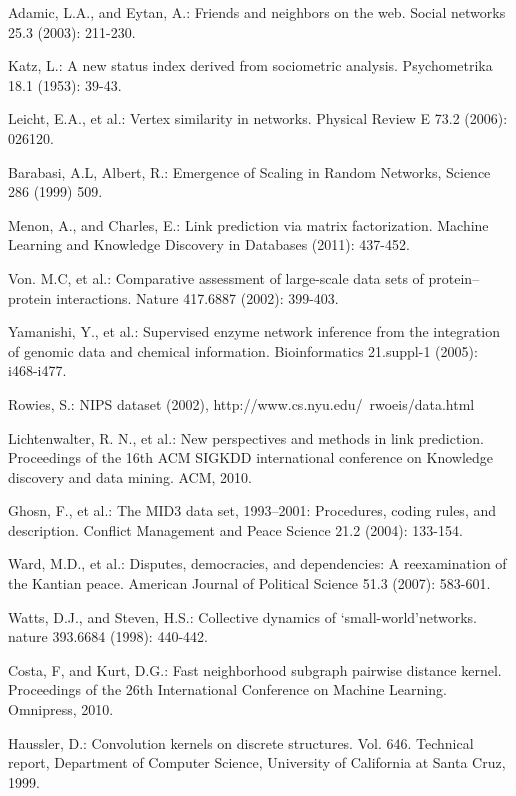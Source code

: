 \documentclass[runningheads,a4paper]{llncs}
\begin{document}
\begin{thebibliography}{4}

 Adamic, L.A., and Eytan, A.: Friends and neighbors on the web. Social networks 25.3 (2003): 211-230.

 Katz, L.: A new status index derived from sociometric analysis. Psychometrika 18.1 (1953): 39-43.

 Leicht, E.A., et al.: Vertex similarity in networks. Physical Review E 73.2 (2006): 026120.

  Barabasi, A.L, Albert, R.: Emergence of Scaling in Random Networks, Science 286 (1999) 509.

 Menon, A., and Charles, E.: Link prediction via matrix factorization. Machine Learning and Knowledge Discovery in Databases (2011): 437-452.

 Von. M.C, et al.: Comparative assessment of large-scale data sets of protein–protein interactions. Nature 417.6887 (2002): 399-403.

 Yamanishi, Y., et al.: Supervised enzyme network inference from the integration of genomic data and chemical information. Bioinformatics 21.suppl-1 (2005): i468-i477.

 Rowies, S.: NIPS dataset (2002), http://www.cs.nyu.edu/~rwoeis/data.html

 Lichtenwalter, R. N., et al.: New perspectives and methods in link prediction. Proceedings of the 16th ACM SIGKDD international conference on Knowledge discovery and data mining. ACM, 2010.

 Ghosn, F., et al.: The MID3 data set, 1993–2001: Procedures, coding rules, and description. Conflict Management and Peace Science 21.2 (2004): 133-154.

 Ward, M.D., et al.: Disputes, democracies, and dependencies: A reexamination of the Kantian peace. American Journal of Political Science 51.3 (2007): 583-601.

 Watts, D.J., and Steven, H.S.: Collective dynamics of ‘small-world’networks. nature 393.6684 (1998): 440-442.

 Costa, F, and Kurt, D.G.: Fast neighborhood subgraph pairwise distance kernel. Proceedings of the 26th International Conference on Machine Learning. Omnipress, 2010.

 Haussler, D.: Convolution kernels on discrete structures. Vol. 646. Technical report, Department of Computer Science, University of California at Santa Cruz, 1999.


\end{thebibliography}
\end{document}
